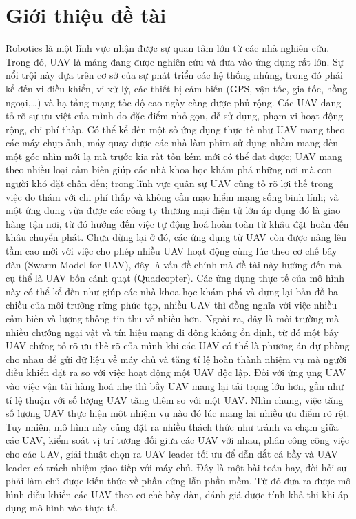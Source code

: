 \chapter{Giới thiệu đề tài}
\pagestyle{fancy}
Robotics là một lĩnh vực nhận được sự quan tâm lớn từ các nhà nghiên cứu. Trong đó, UAV là mảng đang được nghiên cứu và đưa vào ứng dụng rất lớn. Sự nổi trội này dựa trên cơ sở của sự phát triển các hệ thống nhúng, trong đó phải kể đến vi điều khiển, vi xử lý, các thiết bị cảm biến (GPS, vận tốc, gia tốc, hồng ngoại,…) và hạ tầng mạng tốc độ cao ngày càng được phủ rộng.
Các UAV đang tỏ rõ sự ưu việt của mình do đặc điểm nhỏ gọn, dễ sử dụng, phạm vi hoạt động rộng, chi phí thấp. Có thể kể đến một số ứng dụng thực tế như UAV mang theo các máy chụp ảnh, máy quay được các nhà làm phim sử dụng nhằm mang đến một góc nhìn mới lạ mà trước kia rất tốn kém mới có thể đạt được; UAV mang theo nhiều loại cảm biến giúp các nhà khoa học khám phá những nơi mà con người khó đặt chân đến; trong lĩnh vực quân sự UAV cũng tỏ rõ lợi thế trong việc do thám với chi phí thấp và không cần mạo hiểm mạng sống binh lính; và một ứng dụng vừa được các công ty thương mại điện tử lớn áp dụng đó là giao hàng tận nơi, từ đó hướng đến việc tự động hoá hoàn toàn từ khâu đặt hoàn đến khâu chuyển phát.
Chưa dừng lại ở đó, các ứng dụng từ UAV còn được nâng lên tầm cao mới với việc cho phép nhiều UAV hoạt động cùng lúc theo cơ chế bây đàn (Swarm Model for UAV), đây là vấn đề chính mà đề tài này hướng đến mà cụ thể là UAV bốn cánh quạt (Quadcopter).
Các ứng dụng thực tế của mô hình này có thể kể đến như giúp các nhà khoa học khám phá và dựng lại bản đồ ba chiều của môi trường rừng phức tạp, nhiều UAV thì đồng nghĩa với việc nhiều cảm biến và lượng thông tin thu về nhiều hơn. Ngoài ra, đây là môi trường mà nhiều chướng ngại vật và tín hiệu mạng di động không ổn định, từ đó một bầy UAV chứng tỏ rõ ưu thế rõ của mình khi các UAV có thể là phương án dự phòng cho nhau để gửi dữ liệu về máy chủ và tăng tỉ lệ hoàn thành nhiệm vụ mà người điều khiển đặt ra so với việc hoạt động một UAV độc lập. Đối với ứng ụng UAV vào việc vận tải hàng hoá nhẹ thì bầy UAV mang lại tải trọng lớn hơn, gần như tỉ lệ thuận với số lượng UAV tăng thêm so với một UAV.
Nhìn chung, việc tăng số lượng UAV thực hiện một nhiệm vụ nào đó lúc mang lại nhiều ưu điểm rõ rệt. Tuy nhiên, mô hình này cũng đặt ra nhiều thách thức như tránh va chạm giữa các UAV, kiểm soát vị trí tương đối giữa các UAV với nhau, phân công công việc cho các UAV, giải thuật chọn ra UAV leader tối ưu để dẫn dắt cả bầy và UAV leader có trách nhiệm giao tiếp với máy chủ.
Đây là một bài toán hay, đòi hỏi sự phải làm chủ được kiến thức về phần cứng lẫn phần mềm. Từ đó đưa ra được mô hình điều khiển các UAV theo cơ chế bày đàn, đánh giá được tính khả thi khi áp dụng mô hình vào thực tế.

